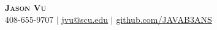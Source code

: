 \begin{center}
    \textbf{\Huge \scshape Jason Vu} \\ \vspace{1pt}
    \small 408-655-9707 $|$ \href{mailto:jvu@scu.edu}{\underline{jvu@scu.edu}} $|$
    \href{https://github.com/javab3ans}{\underline{github.com/JAVAB3ANS}} 
\end{center} 